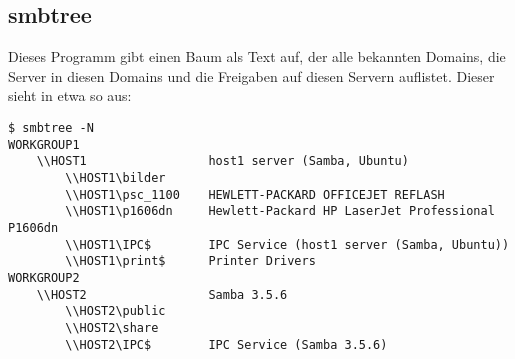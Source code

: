 \begin{normaltext}
  \subsection*{smbtree}
  Dieses Programm gibt einen Baum als Text auf, der alle bekannten Domains,
  die Server in diesen Domains und die Freigaben auf diesen Servern auflistet.
  Dieser sieht in etwa so aus:
  \begin{verbatim}
$ smbtree -N
WORKGROUP1
	\\HOST1         		host1 server (Samba, Ubuntu)
		\\HOST1\bilder         	
		\\HOST1\psc_1100    HEWLETT-PACKARD OFFICEJET REFLASH
		\\HOST1\p1606dn    	Hewlett-Packard HP LaserJet Professional P1606dn
		\\HOST1\IPC$       	IPC Service (host1 server (Samba, Ubuntu))
		\\HOST1\print$     	Printer Drivers
WORKGROUP2
	\\HOST2         		Samba 3.5.6
		\\HOST2\public         	
		\\HOST2\share          	
		\\HOST2\IPC$       	IPC Service (Samba 3.5.6)
  \end{verbatim}
\end{normaltext}
